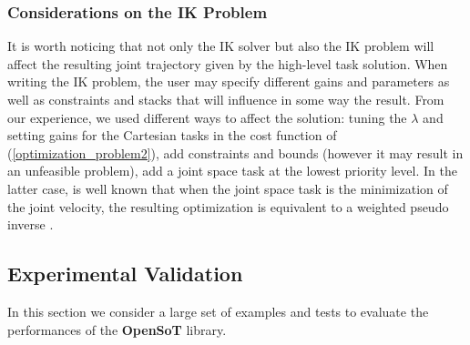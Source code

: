 \subsubsection{Considerations on the IK Problem}
It is worth noticing that not only the IK solver but also the IK problem will affect the resulting joint trajectory given by the high-level task solution.
When writing the IK problem, the user may specify different gains and parameters as well as constraints and stacks that will influence in some way the result. From our experience, we used different ways to affect the solution: tuning the $\lambda$ and setting gains for the Cartesian tasks in the cost function of (\ref{optimization_problem2}), add constraints and bounds (however it may result in an unfeasible problem), add a joint space task at the lowest priority level. In the latter case, is well known that when the joint space task is the minimization of the joint velocity, the resulting optimization is equivalent to a weighted pseudo inverse \cite{Siciliano:2008:RMP:1524151}.


\subsection{Experimental Validation}
\label{sec:examples}
In this section we consider a large set of examples and tests to evaluate the performances of the \textbf{OpenSoT} library.

